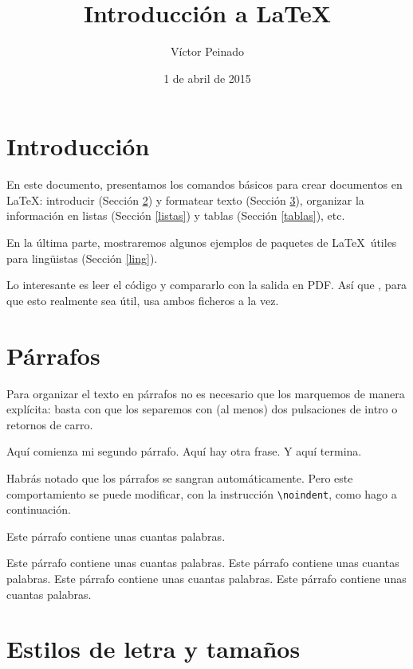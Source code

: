 \documentclass[a4paper]{article}
\title{Introducción a \LaTeX}
\author{Víctor Peinado}
\date{1 de abril de 2015}
\begin{document}
\maketitle

\section{Introducción}
\label{sec:intro}

En este documento, presentamos los comandos básicos para crear documentos en \LaTeX: introducir (Sección \ref{parrafos})  y formatear texto (Sección \ref{estilos}), organizar la información en listas (Sección \ref{listas}) y tablas (Sección \ref{tablas}), etc. 

En la última parte, mostraremos algunos ejemplos de paquetes de \LaTeX\ útiles para lingüistas (Sección \ref{ling}).

Lo interesante es leer el código y compararlo con la salida en PDF. Así que , para que esto realmente sea útil, usa ambos ficheros a la vez.


\section{Párrafos}
\label{parrafos}

Para organizar el texto en párrafos no es necesario que los marquemos de manera explícita: basta con que los separemos con (al menos) dos pulsaciones de intro o retornos de carro.

Aquí comienza mi segundo párrafo.                           
Aquí hay otra frase.                      Y aquí termina.




Habrás notado que los párrafos se sangran automáticamente. Pero este comportamiento se puede modificar, con la instrucción \texttt{\textbackslash noindent}, como hago a continuación.

\noindent Este párrafo contiene unas cuantas palabras.


\noindent Este párrafo contiene unas cuantas palabras. Este párrafo contiene unas cuantas palabras. Este párrafo contiene unas cuantas palabras. Este párrafo contiene unas cuantas palabras.


\section{Estilos de letra y tamaños}
\label{estilos}
\end{document}
